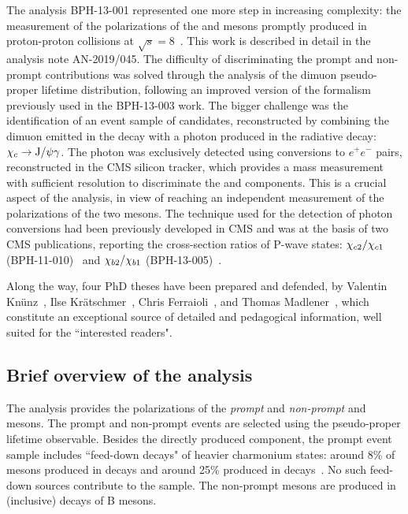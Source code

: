The analysis BPH-13-001 represented one more step in increasing complexity:
the measurement of the polarizations of the \chicOne and \chicTwo mesons 
promptly produced in proton-proton collisions at $\sqrt{s} = 8$\TeV~\cite{bib:BPH-13-001}.
This work is described in detail in the analysis note AN-2019/045.
The difficulty of discriminating the prompt and non-prompt contributions
was solved through the analysis of the dimuon pseudo-proper lifetime distribution,
following an improved version of the formalism previously used in the BPH-13-003 work.
The bigger challenge was the identification of an event sample of \chic candidates,
reconstructed by combining the dimuon emitted in the \jpsi decay with a photon
produced in the radiative \chic decay: $\chi_c \to \text{J/}\psi \gamma$.
The photon was exclusively detected using conversions to $e^+e^-$ pairs,
reconstructed in the CMS silicon tracker,
which provides a \chic mass measurement with sufficient resolution to discriminate the
\chicOne and \chicTwo components.
This is a crucial aspect of the analysis, in view of reaching an independent measurement of 
the polarizations of the two mesons.
The technique used for the detection of photon conversions 
had been previously developed in CMS and was at the basis of two CMS publications,
reporting the cross-section ratios of P-wave states: 
$\chi_{c2} / \chi_{c1}$ (BPH-11-010)~\cite{bib:BPH-11-010} and 
$\chi_{b2} / \chi_{b1}$ (BPH-13-005)~\cite{bib:BPH-13-005}.

Along the way, four PhD theses have been prepared and defended, 
by Valentin Kn{\"u}nz~\cite{bib:ValentinPhD},
Ilse Kr{\"a}tschmer~\cite{bib:IlsePhD}, 
Chris Ferraioli~\cite{bib:ChrisPhD}, 
and Thomas Madlener~\cite{bib:ThomasPhD},
which constitute an exceptional source of detailed and pedagogical information, 
well suited for the ``interested readers".

\subsection{Brief overview of the analysis}

The analysis provides the polarizations of the \emph{prompt} and 
\emph{non-prompt} \jpsi and \psip mesons.
The prompt and non-prompt events are selected using the pseudo-proper lifetime observable.
Besides the directly produced component, the prompt \jpsi event sample includes 
``feed-down decays" of heavier charmonium states:
around 8\% of mesons produced in \psip decays and 
around 25\% produced in \chic decays~\cite{bib:Faccioli-feeddown}.
No such feed-down sources contribute to the \psip sample.
The non-prompt mesons are produced in (inclusive) decays of B mesons.

